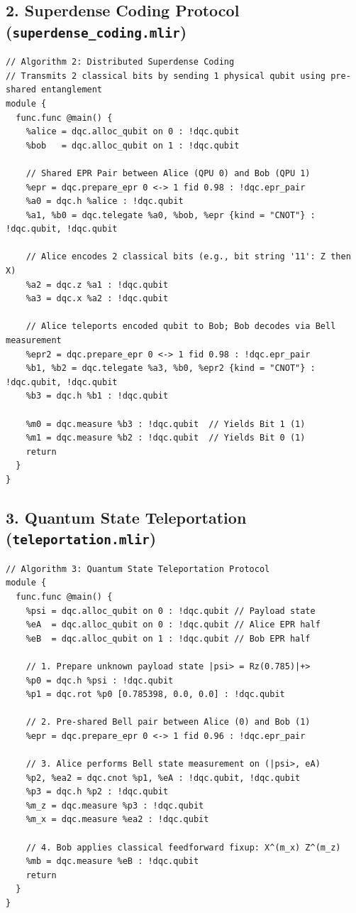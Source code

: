 \subsection{2. Superdense Coding Protocol (\texttt{superdense\_coding.mlir})}
\begin{lstlisting}[language=MLIR, caption={superdense\_coding.mlir}]
// Algorithm 2: Distributed Superdense Coding
// Transmits 2 classical bits by sending 1 physical qubit using pre-shared entanglement
module {
  func.func @main() {
    %alice = dqc.alloc_qubit on 0 : !dqc.qubit
    %bob   = dqc.alloc_qubit on 1 : !dqc.qubit

    // Shared EPR Pair between Alice (QPU 0) and Bob (QPU 1)
    %epr = dqc.prepare_epr 0 <-> 1 fid 0.98 : !dqc.epr_pair
    %a0 = dqc.h %alice : !dqc.qubit
    %a1, %b0 = dqc.telegate %a0, %bob, %epr {kind = "CNOT"} : !dqc.qubit, !dqc.qubit

    // Alice encodes 2 classical bits (e.g., bit string '11': Z then X)
    %a2 = dqc.z %a1 : !dqc.qubit
    %a3 = dqc.x %a2 : !dqc.qubit

    // Alice teleports encoded qubit to Bob; Bob decodes via Bell measurement
    %epr2 = dqc.prepare_epr 0 <-> 1 fid 0.98 : !dqc.epr_pair
    %b1, %b2 = dqc.telegate %a3, %b0, %epr2 {kind = "CNOT"} : !dqc.qubit, !dqc.qubit
    %b3 = dqc.h %b1 : !dqc.qubit

    %m0 = dqc.measure %b3 : !dqc.qubit  // Yields Bit 1 (1)
    %m1 = dqc.measure %b2 : !dqc.qubit  // Yields Bit 0 (1)
    return
  }
}
\end{lstlisting}

\subsection{3. Quantum State Teleportation (\texttt{teleportation.mlir})}
\begin{lstlisting}[language=MLIR, caption={teleportation.mlir}]
// Algorithm 3: Quantum State Teleportation Protocol
module {
  func.func @main() {
    %psi = dqc.alloc_qubit on 0 : !dqc.qubit // Payload state
    %eA  = dqc.alloc_qubit on 0 : !dqc.qubit // Alice EPR half
    %eB  = dqc.alloc_qubit on 1 : !dqc.qubit // Bob EPR half

    // 1. Prepare unknown payload state |psi> = Rz(0.785)|+>
    %p0 = dqc.h %psi : !dqc.qubit
    %p1 = dqc.rot %p0 [0.785398, 0.0, 0.0] : !dqc.qubit

    // 2. Pre-shared Bell pair between Alice (0) and Bob (1)
    %epr = dqc.prepare_epr 0 <-> 1 fid 0.96 : !dqc.epr_pair

    // 3. Alice performs Bell state measurement on (|psi>, eA)
    %p2, %ea2 = dqc.cnot %p1, %eA : !dqc.qubit, !dqc.qubit
    %p3 = dqc.h %p2 : !dqc.qubit
    %m_z = dqc.measure %p3 : !dqc.qubit
    %m_x = dqc.measure %ea2 : !dqc.qubit

    // 4. Bob applies classical feedforward fixup: X^(m_x) Z^(m_z)
    %mb = dqc.measure %eB : !dqc.qubit
    return
  }
}
\end{lstlisting}


